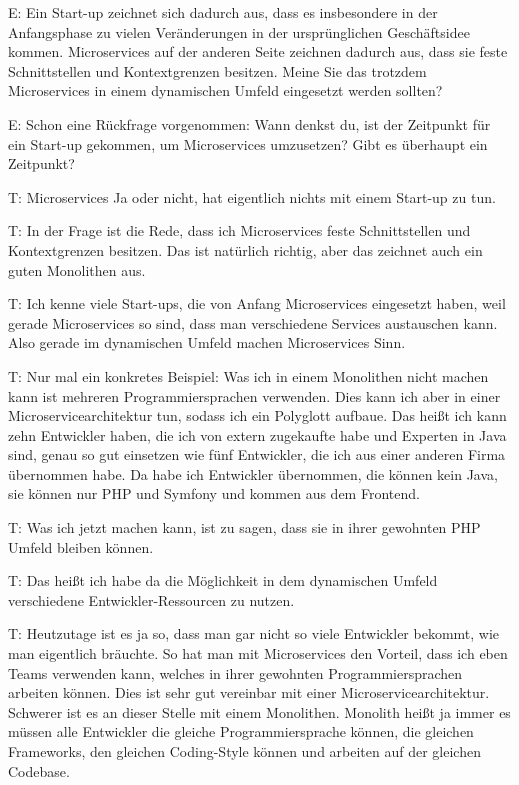 E: Ein Start-up zeichnet sich dadurch aus, dass es insbesondere in der Anfangsphase zu vielen Veränderungen in der ursprünglichen Geschäftsidee kommen. Microservices auf der anderen Seite zeichnen dadurch aus, dass sie feste Schnittstellen und Kontextgrenzen besitzen. Meine Sie das trotzdem Microservices in einem dynamischen Umfeld eingesetzt werden sollten?

E: Schon eine Rückfrage vorgenommen: Wann denkst du, ist der Zeitpunkt für ein Start-up gekommen, um Microservices umzusetzen? Gibt es überhaupt ein Zeitpunkt? 

\label{appendix:t-3}
T: Microservices Ja oder nicht, hat eigentlich nichts mit einem Start-up zu tun.

\label{appendix:t-4}
T: In der Frage ist die Rede, dass ich Microservices feste Schnittstellen und Kontextgrenzen besitzen. Das ist natürlich richtig, aber das zeichnet auch ein guten Monolithen aus.

\label{appendix:t-5}
T: Ich kenne viele Start-ups, die von Anfang Microservices eingesetzt haben, weil gerade Microservices so sind, dass man verschiedene Services austauschen kann. Also gerade im dynamischen Umfeld machen Microservices Sinn.

T: Nur mal ein konkretes Beispiel: Was ich in einem Monolithen nicht machen kann ist mehreren Programmiersprachen verwenden. Dies kann ich aber in einer Microservicearchitektur tun, sodass ich ein Polyglott aufbaue. Das heißt ich kann zehn Entwickler haben, die ich von extern zugekaufte habe und Experten in Java sind, genau so gut einsetzen wie fünf Entwickler, die ich aus einer anderen Firma übernommen habe. Da habe ich Entwickler übernommen, die können kein Java, sie können nur PHP und Symfony und kommen aus dem Frontend.

T: Was ich jetzt machen kann, ist zu sagen, dass sie in ihrer gewohnten PHP Umfeld bleiben können.

\label{appendix:t-6}
T: Das heißt ich habe da die Möglichkeit in dem dynamischen Umfeld verschiedene Entwickler-Ressourcen zu nutzen.

T: Heutzutage ist es ja so, dass man gar nicht so viele Entwickler bekommt, wie man eigentlich bräuchte. So hat man mit Microservices den Vorteil, dass ich eben Teams verwenden kann, welches in ihrer gewohnten Programmiersprachen arbeiten können. Dies ist sehr gut vereinbar mit einer Microservicearchitektur. Schwerer ist es an dieser Stelle mit einem Monolithen. Monolith heißt ja immer es müssen alle Entwickler die gleiche Programmiersprache können, die gleichen Frameworks, den gleichen Coding-Style können und arbeiten auf der gleichen Codebase.

